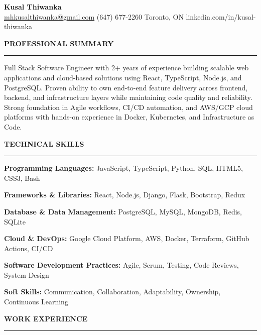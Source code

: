 \documentclass[10pt,letterpaper]{article}
\begin{document}
\begin{center}
{\LARGE\textbf{Kusal Thiwanka}}\\[3pt]
\href{mailto:mhkusalthiwanka@gmail.com}{mhkusalthiwanka@gmail.com}\hspace{2em}%
(647) 677{-}2260\hspace{2em}%
Toronto, ON\hspace{2em}
linkedin.com/in/kusal-thiwanka
\end{center}

\vspace{6pt}

\textbf{PROFESSIONAL SUMMARY}\\[-8pt]
\noindent\rule{\textwidth}{1pt}

\vspace{-2pt}

Full Stack Software Engineer with 2+ years of experience building scalable web applications and cloud-based solutions using React, TypeScript, Node.js, and PostgreSQL. Proven ability to own end-to-end feature delivery across frontend, backend, and infrastructure layers while maintaining code quality and reliability. Strong foundation in Agile workflows, CI/CD automation, and AWS/GCP cloud platforms with hands-on experience in Docker, Kubernetes, and Infrastructure as Code.

\vspace{8pt}

\textbf{TECHNICAL SKILLS}\\[-8pt]
\noindent\rule{\textwidth}{1pt}

\vspace{-2pt}

\textbf{Programming Languages:} JavaScript, TypeScript, Python, SQL, HTML5, CSS3, Bash

\textbf{Frameworks \& Libraries:} React, Node.js, Django, Flask, Bootstrap, Redux

\textbf{Database \& Data Management:} PostgreSQL, MySQL, MongoDB, Redis, SQLite

\textbf{Cloud \& DevOps:} Google Cloud Platform, AWS, Docker, Terraform, GitHub Actions, CI/CD

\textbf{Software Development Practices:} Agile, Scrum, Testing, Code Reviews, System Design

\textbf{Soft Skills:} Communication, Collaboration, Adaptability, Ownership, Continuous Learning

\vspace{8pt}

\textbf{WORK EXPERIENCE}\\[-8pt]
\noindent\rule{\textwidth}{1pt}
\end{document}
